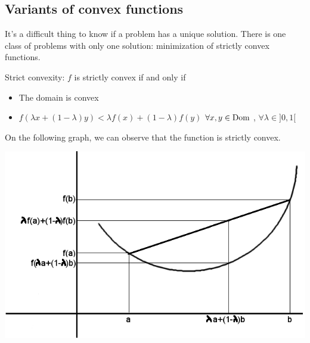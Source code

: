  \subsection{Variants of convex functions}
 It's a difficult thing to know if a problem has a unique solution. There is one class of problems with only one solution: minimization of strictly convex functions.
 \vspace{0.5cm}
 \begin{definition}
 Strict convexity: $f$ is strictly convex if and only if 
 \begin{itemize}
 \item The domain is convex
 \item $f(\lambda x + (1-\lambda)y)<\lambda f(x) + (1-\lambda) f(y)$ $\forall x,y \in \textnormal{Dom}$ , $\forall \lambda \in ]0,1[$
 \end{itemize}
 \end{definition}
\vspace{0.5cm}
 \begin{example}
 \begin{leftbar}
 On the following graph, we can observe that the function is strictly convex.
 \begin{center}
 \includegraphics[scale=0.4]{./images/Course4_courbe}
 \end{center}
 \end{leftbar}
 \end{example}
\vspace{0.5cm}
